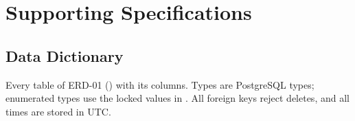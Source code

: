 
\chapter{Supporting Specifications }
\label{app:specs}
\expandafter\def\expandafter\UrlBreaks\expandafter{\UrlBreaks\do\-}

\section{Data Dictionary}
\label{sec:data-dictionary}
Every table of ERD-01 () with its columns. Types are PostgreSQL
types; enumerated types use the locked values in . All foreign
keys reject deletes, and all times are stored in UTC.


